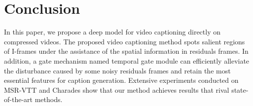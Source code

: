 \documentclass[a4paper,conference]{IEEEtran}
\begin{document}

\section{Conclusion}
In this paper, we propose a deep model for video captioning directly on compressed videos. The proposed video captioning method spots salient regions of I-frames under the assistance of the spatial information in residuals frames. In addition, a gate mechanism named temporal gate module can efficiently alleviate the disturbance caused by some noisy residuals frames and retain the most essential features for caption generation. Extensive experiments conducted on MSR-VTT and Charades show that our method achieves results that rival state-of-the-art methods.






\end{document}
